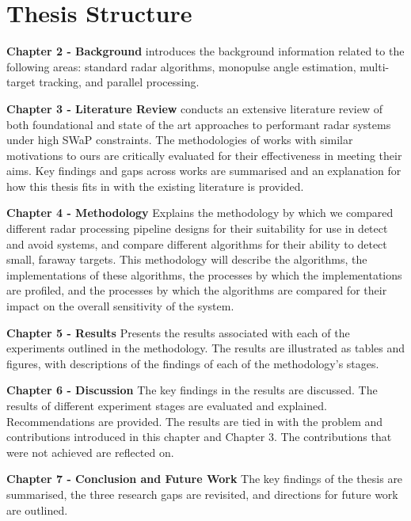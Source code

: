 \section{Thesis Structure}
\textbf{Chapter 2 - Background} introduces the background information related 
to the following areas: standard radar algorithms, monopulse angle estimation, 
multi-target tracking, and parallel processing.

\textbf{Chapter 3 - Literature Review} conducts an extensive literature 
review of both foundational and state of the art approaches to performant 
radar systems under high SWaP constraints. The methodologies of works with 
similar motivations to ours are critically evaluated for their effectiveness 
in meeting their aims. Key findings and gaps across works are summarised and 
an explanation for how this thesis fits in with the existing literature is 
provided. 

\textbf{Chapter 4 - Methodology} Explains the methodology by which we compared 
different radar processing pipeline designs for their suitability for use in 
detect and avoid systems, and compare different algorithms for their ability 
to detect small, faraway targets. This methodology will describe the 
algorithms, the implementations of these algorithms, the processes by which 
the implementations are profiled, and the processes by which the algorithms 
are compared for their impact on the overall sensitivity of the system. 

\textbf{Chapter 5 - Results} Presents the results associated with each of the 
experiments outlined in the methodology. The results are illustrated as tables 
and figures, with descriptions of the findings of each of the methodology's 
stages.

\textbf{Chapter 6 - Discussion} The key findings in the results are discussed. 
The results of different experiment stages are evaluated and explained. 
Recommendations are provided. The results are tied in with the problem 
and contributions introduced in this chapter and Chapter 3. The contributions 
that were not achieved are reflected on. 

\textbf{Chapter 7 - Conclusion and Future Work} The key findings of the thesis 
are summarised, the three research gaps are revisited, and directions for 
future work are outlined.